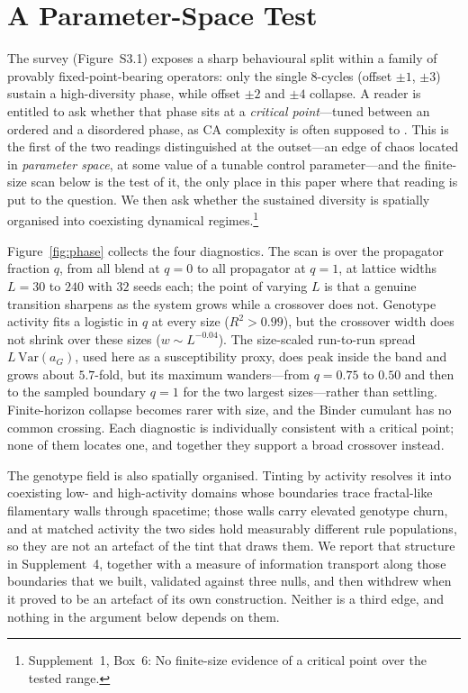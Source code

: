 \documentclass[man,12pt,floatsintext,donotrepeattitle]{apa7}
\newcommand{\suppfindingref}[1]{Supplement~1, Box~#1}
\newcommand{\suppfindingtext}[2]{\suppfindingref{#1}: #2.}
\newcommand{\suppfinding}[2]{\footnote{\suppfindingtext{#1}{#2}}}
\begin{document}
\section{A Parameter-Space Test}
\label{sec:discussion}

The survey (Figure~S3.1) exposes a sharp behavioural split within a
family of provably fixed-point-bearing operators: only the single 8-cycles
(offset $\pm 1$, $\pm 3$) sustain a high-diversity phase, while offset $\pm 2$ and
$\pm 4$ collapse. A reader is entitled to ask whether that phase sits at a
\emph{critical point}---tuned between an ordered and a disordered phase, as CA
complexity is often supposed to \parencite{langton1990computation}. This is the
first of the two readings distinguished at the outset---an edge of chaos located
in \emph{parameter space}, at some value of a tunable control parameter---and
the finite-size scan below is the test of it, the only place in this paper where
that reading is put to the question. We then ask
whether the sustained diversity is spatially organised into coexisting
dynamical regimes.\suppfinding{6}{No finite-size evidence of a critical point over the tested range}

Figure~\ref{fig:phase} collects the four diagnostics. The scan is over the
propagator fraction $q$, from all blend at $q=0$ to all propagator at $q=1$, at
lattice widths $L = 30$ to $240$ with $32$ seeds each; the point of varying $L$
is that a genuine transition sharpens as the system grows while a crossover does
not. Genotype activity fits a logistic in $q$ at every size ($R^2 > 0.99$), but
the crossover width does not shrink over these sizes ($w \sim L^{-0.04}$). The
size-scaled run-to-run spread $L\,\mathrm{Var}(a_G)$, used here as a
susceptibility proxy, does peak inside the band and grows about $5.7$-fold, but
its maximum wanders---from $q=0.75$ to $0.50$ and then to the sampled boundary
$q=1$ for the two largest sizes---rather than settling. Finite-horizon collapse
becomes rarer with size, and the Binder cumulant has no common crossing. Each
diagnostic is individually consistent with a critical point; none of them
locates one, and together they support a broad crossover instead.

The genotype field is also spatially organised. Tinting by activity resolves it
into coexisting low- and high-activity domains whose boundaries trace
fractal-like filamentary walls through spacetime; those walls carry elevated
genotype churn, and at matched activity the two sides hold measurably different
rule populations, so they are not an artefact of the tint that draws them. We
report that structure in Supplement~4, together with a measure of
information transport along those boundaries that we built, validated against
three nulls, and then withdrew when it proved to be an artefact of its own
construction. Neither is a third edge, and nothing in the argument below depends
on them.
\end{document}
